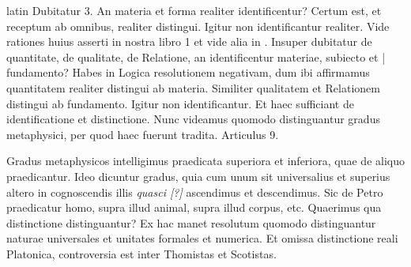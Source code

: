 \begin{otherlanguage*}{latin}
\pstart
 Dubitatur 3. An materia et forma realiter identificentur? Certum est, et receptum ab omnibus, realiter distingui. Igitur non identificantur realiter. Vide rationes huius asserti in nostra  libro 1 et vide alia in  . Insuper dubitatur de quantitate, de qualitate, de Relatione, an identificentur materiae, subiecto et \textnormal{|} fundamento? Habes in Logica resolutionem negativam, dum ibi affirmamus quantitatem realiter distingui ab materia. Similiter qualitatem et Relationem distingui ab fundamento. Igitur non identificantur. Et haec sufficiant de identificatione et distinctione. Nunc videamus quomodo distinguantur gradus metaphysici, per quod haec fuerunt tradita. Articulus 9. 
\pend

        \pstart
        \pend
      
\pstart
 Gradus metaphysicos intelligimus praedicata superiora et inferiora, quae de aliquo praedicantur. Ideo dicuntur gradus, quia cum unum sit universalius et superius altero in cognoscendis illis \emph{quasci [?]}  ascendimus et descendimus. Sic de Petro praedicatur homo, supra illud animal, supra illud corpus, etc. Quaerimus qua distinctione distinguantur? Ex hac manet resolutum quomodo distinguantur naturae universales et unitates formales et numerica. Et omissa distinctione reali Platonica, controversia est inter Thomistas et Scotistas. 
\pend


\end{otherlanguage*}
